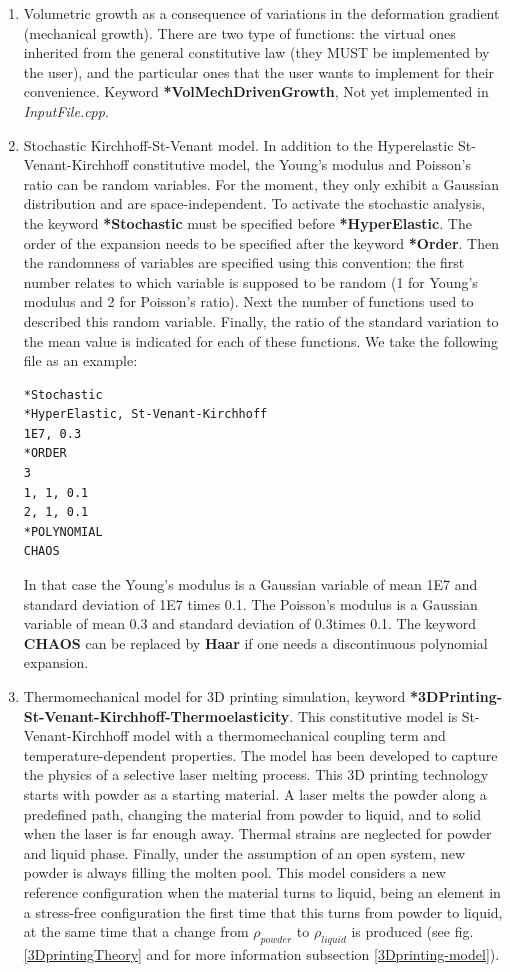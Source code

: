 \documentclass[oneside,11pt,times]{book}
\begin{document}
\begin{enumerate}
\item Volumetric growth as a consequence of variations in the deformation gradient (mechanical growth). There are two type of functions: the virtual ones inherited from the general constitutive law (they MUST be implemented by the user), and the particular ones that the user wants to implement for their convenience. Keyword \textbf{*VolMechDrivenGrowth}, Not yet implemented in \textit{InputFile.cpp}.

\item Stochastic Kirchhoff-St-Venant model. In addition to the Hyperelastic St-Venant-Kirchhoff constitutive model, the Young's modulus and Poisson's ratio can be random variables. For the moment, they only exhibit a Gaussian distribution and are space-independent. To activate the stochastic analysis, the keyword \textbf{*Stochastic} must be specified before \textbf{*HyperElastic}. The order of the expansion needs to be specified after the keyword \textbf{*Order}. Then the randomness of variables are specified using this convention: the first number relates to which variable is supposed to be random (1 for Young's modulus and 2 for Poisson's ratio). Next the number of functions used to described this random variable. Finally, the ratio of the standard variation to the mean value is indicated for each of these functions. We take the following file as an example:
\begin{lstlisting}
*Stochastic
*HyperElastic, St-Venant-Kirchhoff
1E7, 0.3
*ORDER
3
1, 1, 0.1
2, 1, 0.1
*POLYNOMIAL
CHAOS
\end{lstlisting}
In that case the Young's modulus is a Gaussian variable of mean 1E7 and standard deviation of 1E7 times 0.1. The Poisson's modulus is a Gaussian variable of mean 0.3 and standard deviation of 0.3times 0.1.
The keyword \textbf{CHAOS} can be replaced by \textbf{Haar} if one needs a discontinuous polynomial expansion.
\item Thermomechanical model for 3D printing simulation, keyword \textbf{*3DPrinting-St-Venant-Kirchhoff-Thermoelasticity}. This constitutive model is St-Venant-Kirchhoff model with a thermomechanical coupling term and temperature-dependent properties. The model has been developed to capture the physics of a selective laser melting process. This 3D printing technology starts with powder as a starting material. A laser melts the powder along a predefined path, changing the material from powder to liquid, and to solid when the laser is far enough away. Thermal strains are neglected for powder and liquid phase. Finally, under the assumption of an open system, new powder is always filling the molten pool. This model considers a new reference configuration when the material turns to liquid, being an element in a stress-free configuration the first time that this turns from powder to liquid, at the same time that a change from $\rho_{powder}$ to  $\rho_{liquid}$ is produced (see fig.  \ref{3DprintingTheory} and for more information subsection \ref{3Dprinting-model}).

\end{enumerate}
\end{document}
